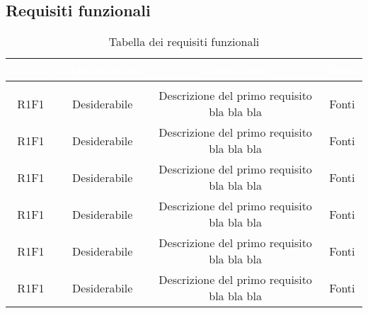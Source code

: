 \subsection{Requisiti funzionali}
\renewcommand{\arraystretch}{1.5}
\begin{center}
\begin{longtable}{C{\colA} C{\colB} C{\colC} C{\colA}}
		\textcolor{white}{\textbf{Codice}} & 
		\textcolor{white}{\textbf{Classificazione}} & 
		\textcolor{white}{\textbf{Descrizione}} & 
		\textcolor{white}{\textbf{Fonti}} \\
		\endfirsthead
	    \\
	    \endfoot
	    \caption{Tabella dei requisiti funzionali}
	    \endlastfoot

R1F1 & Desiderabile & Descrizione del primo requisito bla bla bla & Fonti \\
R1F1 & Desiderabile & Descrizione del primo requisito bla bla bla & Fonti \\
R1F1 & Desiderabile & Descrizione del primo requisito bla bla bla & Fonti \\
R1F1 & Desiderabile & Descrizione del primo requisito bla bla bla & Fonti \\
R1F1 & Desiderabile & Descrizione del primo requisito bla bla bla & Fonti \\
R1F1 & Desiderabile & Descrizione del primo requisito bla bla bla & Fonti \\
\end{longtable}
\end{center}



